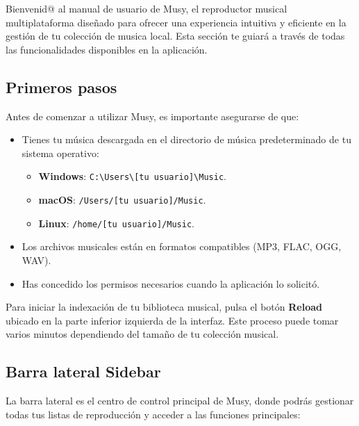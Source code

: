 \documentclass[11pt, a4paper]{article}
\begin{document}
Bienvenid@ al manual de usuario de Musy, el reproductor musical multiplataforma diseñado para ofrecer una experiencia intuitiva y eficiente en la gestión de tu colección de musica local. Esta sección te guiará a través de todas las funcionalidades disponibles en la aplicación.

  \subsection{Primeros pasos}

  Antes de comenzar a utilizar Musy, es importante asegurarse de que:

  \begin{itemize}
      \item Tienes tu música descargada en el directorio de música predeterminado de tu sistema operativo:
      \begin{itemize}
          \item \textbf{Windows}: \texttt{C:\textbackslash Users\textbackslash [tu usuario]\textbackslash Music}.
          \item \textbf{macOS}: \texttt{/Users/[tu usuario]/Music}.
          \item \textbf{Linux}: \texttt{/home/[tu usuario]/Music}.
      \end{itemize}
      \item Los archivos musicales están en formatos compatibles (MP3, FLAC, OGG, WAV).
      \item Has concedido los permisos necesarios cuando la aplicación lo solicitó.
  \end{itemize}

  Para iniciar la indexación de tu biblioteca musical, pulsa el botón \textbf{Reload} ubicado en la parte inferior izquierda de la interfaz. Este proceso puede tomar varios minutos dependiendo del tamaño de tu colección musical.

  \subsection{Barra lateral Sidebar}

  La barra lateral es el centro de control principal de Musy, donde podrás gestionar todas tus listas de reproducción y acceder a las funciones principales:
\end{document}
